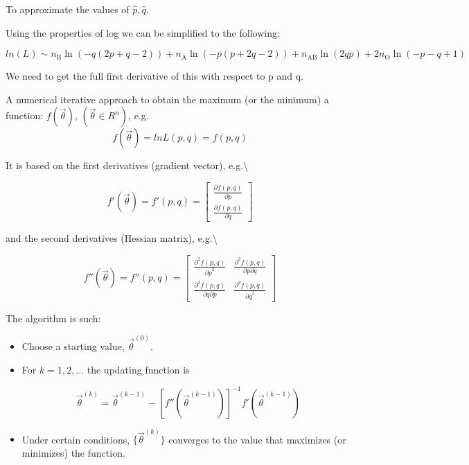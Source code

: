 \documentclass[]{article}
\begin{document}
To approximate the values of \(\hat{p}, \hat{q}.\)

Using the properties of log we can be simplified to the following:

\[ln(L) \sim n_\text{B}\ln\left(-q\left(2p+q-2\right)\right)+n_\text{A}\ln\left(-p\left(p+2q-2\right)\right)+n_\text{AB}\ln\left(2qp\right)+2n_\text{O}\ln\left(-p-q+1\right)
\]

We need to get the full first derivative of this with respect to p and
q.

\item 

A numerical iterative approach to obtain the maximum (or the minimum) a
function: \(f(\vec \theta)\), \((\vec \theta \in R^n)\), e.g.
\[f(\vec \theta) = lnL(p,q) = f(p,q)\] \smallskip

\item 

It is based on the first derivatives (gradient vector),
e.g.\textbackslash{}

\[ f'(\vec \theta) = f'(p,q) = 
\left[ \begin{array}{c} 
\frac{\partial{f(p,q)}}{\partial{p}}\\
\frac{\partial{f(p,q)}}{\partial{q}}
\end{array} \right] \] \bigskip

and the second derivatives (Hessian matrix), e.g.\textbackslash{}

\[ f''(\vec \theta) = f''(p,q) = 
\left[ \begin{array}{cc} 
\frac{\partial^2 {f(p,q)}}{{\partial{p}}^2}&
\frac{\partial^2 {f(p,q)}}{\partial{p}\partial{q}}\\
\frac{\partial^2 {f(p,q)}}{\partial{q}\partial{p}}&
\frac{\partial^2 {f(p,q)}}{{\partial{q}}^2}
\end{array} \right] \] \bigskip

\item 

The algorithm is such:

\begin{itemize}

\item Choose a starting value, $\vec \theta ^{(0)}$. 

\item For $k=1,2,...$ the updating function is

$$\vec \theta^{(k)} = \vec \theta^{(k-1)} 
- [f''(\vec \theta^{(k-1)})]^{-1} f'(\vec \theta^{(k-1)})$$  
\bigskip

\item Under certain conditions, $\{\vec \theta^{(k)}\}$ converges to the value that maximizes (or minimizes) the function. 
\end{itemize}
\end{document}
